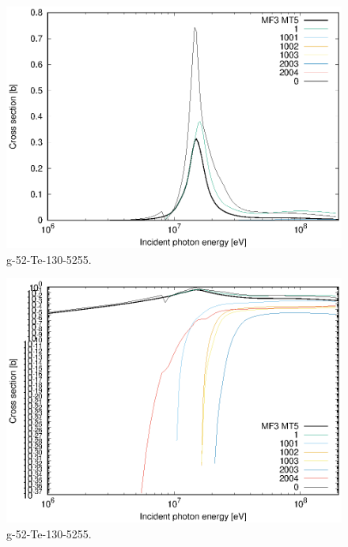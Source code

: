 \begin{figure}
 \includegraphics[width=\linewidth]{eps/g_52-Te-130_5255.eps}
  \caption{g-52-Te-130-5255.}
\end{figure}
\begin{figure}
 \includegraphics[width=\linewidth]{eps-log/g_52-Te-130_5255.eps}
 \caption{g-52-Te-130-5255.}
\end{figure}
\newpage \clearpage

